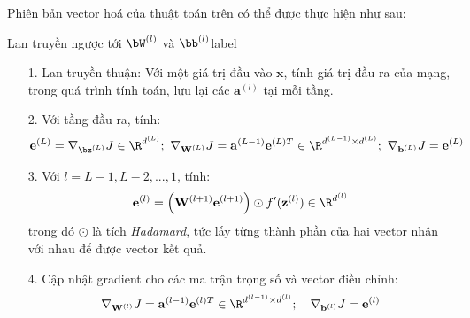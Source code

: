 Phiên bản vector hoá của thuật toán trên có thể được thực hiện như
sau:
\begin{myalg}{Lan truyền ngược tới $\bW^{(l)}$ và $\bb^{(l)}$}{label}
\begin{enumerate}
    \item[1.] Lan truyền thuận: Với một giá trị đầu vào $\mathbf{x}$, tính giá trị đầu
    ra của mạng, trong quá trình tính toán, lưu lại các $\mathbf{a}^{(l)}$ tại mỗi tầng.

    \item[2.] Với tầng đầu ra, tính:
    \begin{eqnarray*} 
        \mathbf{e}^{(L)} = \nabla_{\bz^{(L)}}J \in
        \R^{d^{(L)}};~
        \nabla_{\mathbf{W}^{(L)}}J =
        \mathbf{a}^{(L-1)}\mathbf{e}^{(L)T} \in \R^{d^{(L-1)}\times d^{(L)}};
        ~
        \nabla_{\mathbf{b}^{(L)}}J =  \mathbf{e}^{(L)}
    \end{eqnarray*} 
    \item[3.] Với $l = L-1, L-2, ..., 1$, tính: 
    \begin{equation} 
    \mathbf{e}^{(l)} = \left( \mathbf{W}^{(l+1)} \mathbf{e}^{(l+1)} \right)
    \odot f'(\mathbf{z}^{(l)}) \in \R^{d^{(l)}}
    \end{equation} 
    trong đó $\odot$ là tích \textit{Hadamard}, tức lấy từng thành phần của hai vector nhân với nhau để được vector kết quả. 
    \item[4.] Cập nhật gradient cho các ma trận trọng số và vector điều chỉnh: 
    \begin{eqnarray} 
    \nabla_{\mathbf{W}^{(l)}}J =
    \mathbf{a}^{(l-1)}\mathbf{e}^{(l)T} \in \R^{d^{(l-1)}\times d^{(l)}}; \quad 
    \nabla_{\mathbf{b}^{(l)}}J = \mathbf{e}^{(l)} 
\end{eqnarray} 
 \end{enumerate} 
\end{myalg}
